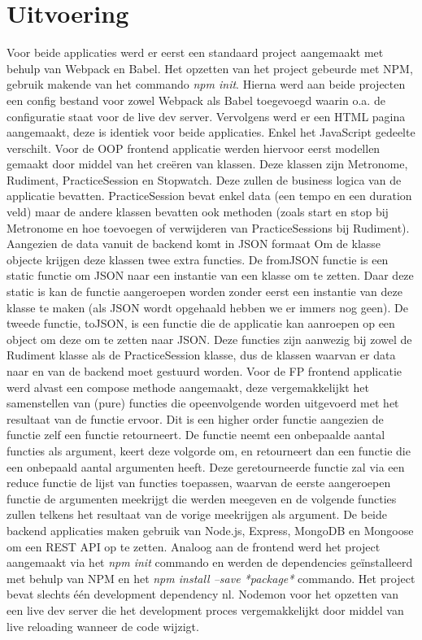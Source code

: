 \section{Uitvoering}
Voor beide applicaties werd er eerst een standaard project aangemaakt met behulp van Webpack en Babel. Het opzetten van het project gebeurde met NPM, gebruik makende van het commando \textit{npm init}. Hierna werd aan beide projecten een config bestand voor zowel Webpack als Babel toegevoegd waarin o.a. de configuratie staat voor de live dev server. Vervolgens werd er een HTML pagina aangemaakt, deze is identiek voor beide applicaties. Enkel het JavaScript gedeelte verschilt. Voor de OOP frontend applicatie werden hiervoor eerst modellen gemaakt door middel van het creëren van klassen. Deze klassen zijn Metronome, Rudiment, PracticeSession en Stopwatch. Deze zullen de business logica van de applicatie bevatten. PracticeSession bevat enkel data (een tempo en een duration veld) maar de andere klassen bevatten ook methoden (zoals start en stop bij Metronome en hoe toevoegen of verwijderen van PracticeSessions bij Rudiment). Aangezien de data vanuit de backend komt in JSON formaat Om de klasse objecte krijgen deze klassen twee extra functies. De fromJSON functie is een static functie om JSON naar een instantie van een klasse om te zetten. Daar deze static is kan de functie aangeroepen worden zonder eerst een instantie van deze klasse te maken (als JSON wordt opgehaald hebben we er immers nog geen). De tweede functie, toJSON, is een functie die de applicatie kan aanroepen op een object om deze om te zetten naar JSON. Deze functies zijn aanwezig bij zowel de Rudiment klasse als de PracticeSession klasse, dus de klassen waarvan er data naar en van de backend moet gestuurd worden. 
Voor de FP frontend applicatie werd alvast een compose methode aangemaakt, deze vergemakkelijkt het samenstellen van (pure) functies die opeenvolgende worden uitgevoerd met het resultaat van de functie ervoor. Dit is een higher order functie aangezien de functie zelf een functie retourneert. De functie neemt een onbepaalde aantal functies als argument, keert deze volgorde om, en retourneert dan een functie die een onbepaald aantal argumenten heeft. Deze geretourneerde functie zal via een reduce functie de lijst van functies toepassen, waarvan de eerste aangeroepen functie de argumenten meekrijgt die werden meegeven en de volgende functies zullen telkens het resultaat van de vorige meekrijgen als argument.
De beide backend applicaties maken gebruik van Node.js, Express, MongoDB en Mongoose om een REST API op te zetten. Analoog aan de frontend werd het project aangemaakt via het \textit{npm init} commando en werden de dependencies geïnstalleerd met behulp van NPM en het \textit{npm install --save *package*} commando. Het project bevat slechts één development dependency nl. Nodemon voor het opzetten van een live dev server die het development proces vergemakkelijkt door middel van live reloading wanneer de code wijzigt. 

